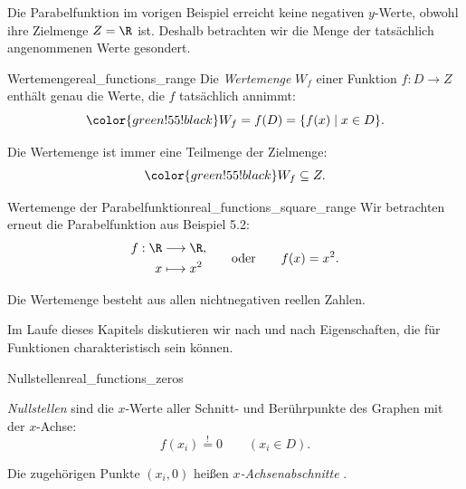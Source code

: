 \par\noindent\begin{minipage}{\linewidth}
Die Parabelfunktion im vorigen Beispiel erreicht keine negativen $y$-Werte,
obwohl ihre Zielmenge $Z=\R$ ist. Deshalb betrachten wir die Menge der tatsächlich
angenommenen Werte gesondert.
\begin{DefinitionBox}{\textcolor{green!55!black}{Wertemenge}}{real_functions_range}
  Die \emph{\textcolor{green!55!black}{Wertemenge}}  $W_f$ einer
  Funktion $f:D\to Z$ enthält genau die Werte, die $f$ tatsächlich annimmt:
  \[
    {\color{green!55!black}W_f}=f(D)=\{f(x)\mid x\in D\}.
  \]
  \par\noindent
  {\centering
    \par}
  \par\smallskip\noindent
  Die Wertemenge ist immer eine Teilmenge der Zielmenge:
  \[
    {\color{green!55!black}W_f}\subseteq Z.
  \]
\end{DefinitionBox}
\begin{ExampleBox}[before skip=0.3\baselineskip]{\textcolor{green!55!black}{Wertemenge} der Parabelfunktion}{real_functions_square_range}
  Wir betrachten erneut die Parabelfunktion aus Beispiel 5.2:
  \[
    \begin{aligned}
      f:\R &\longrightarrow\R,\\
      x &\longmapsto x^2
    \end{aligned}
    \qquad\text{oder}\qquad f(x)=x^2.
  \]
  \par\smallskip
  {\centering
    \par}
  \par\smallskip\noindent
  Die Wertemenge besteht aus allen nichtnegativen reellen Zahlen.
\end{ExampleBox}
\end{minipage}

\par\noindent\begin{minipage}{\linewidth}
Im Laufe dieses Kapitels diskutieren wir nach und nach Eigenschaften, die
für Funktionen charakteristisch sein können.
\begin{FunctionPropertyBox}{Nullstellen}{real_functions_zeros}
  \begin{minipage}[c]{0.55\linewidth}
    \raggedright
    \emph{Nullstellen}  sind die $x$-Werte aller Schnitt-
    und Berührpunkte des Graphen mit der $x$-Achse:
    \[
      f(x_i)\overset{!}{=}0\qquad(x_i\in D).
    \]
  \end{minipage}\hfill
  \begin{minipage}[c]{0.43\linewidth}
    \centering
  \end{minipage}
  Die zugehörigen Punkte $(x_i,0)$ heißen \emph{$x$-Achsenabschnitte} .
\end{FunctionPropertyBox}
\end{minipage}

